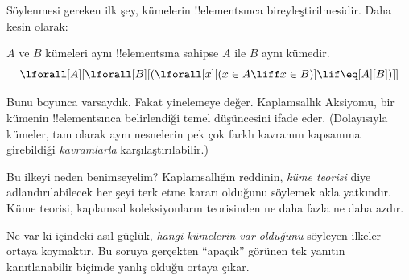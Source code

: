 \documentclass[../../../include/open-logic-section]{subfiles}
\begin{document}

Söylenmesi gereken ilk şey, kümelerin !!{element}s{}ınca bireyleştirilmesidir.
Daha kesin olarak:

\begin{axiom}[Kaplamsallık]
$A$ ve $B$ kümeleri aynı !!{element}s{}ına sahipse $A$ ile $B$ aynı kümedir.
\[
  \lforall[A][\lforall[B][(\lforall[x][(x \in A \liff x \in B)] \lif
  \eq[A][B])]]
\]
\end{axiom}

Bunu  boyunca varsaydık. Fakat yinelemeye değer.
Kaplamsallık Aksiyomu, bir kümenin !!{element}s{}ınca belirlendiği temel
düşüncesini ifade eder. (Dolayısıyla kümeler, tam olarak aynı nesnelerin pek
çok farklı kavramın kapsamına girebildiği \emph{kavramlarla} karşılaştırılabilir.)

Bu ilkeyi neden benimseyelim? Kaplamsallığın reddinin, \emph{küme teorisi}
diye adlandırılabilecek her şeyi terk etme kararı olduğunu söylemek
akla yatkındır. Küme teorisi, kaplamsal koleksiyonların teorisinden ne daha
fazla ne daha azdır.

Ne var ki  içindeki asıl güçlük, \emph{hangi kümelerin
var olduğunu} söyleyen ilkeler ortaya koymaktır. Bu soruya gerçekten
``apaçık'' görünen tek yanıtın kanıtlanabilir biçimde yanlış olduğu ortaya
çıkar.
\end{document}
